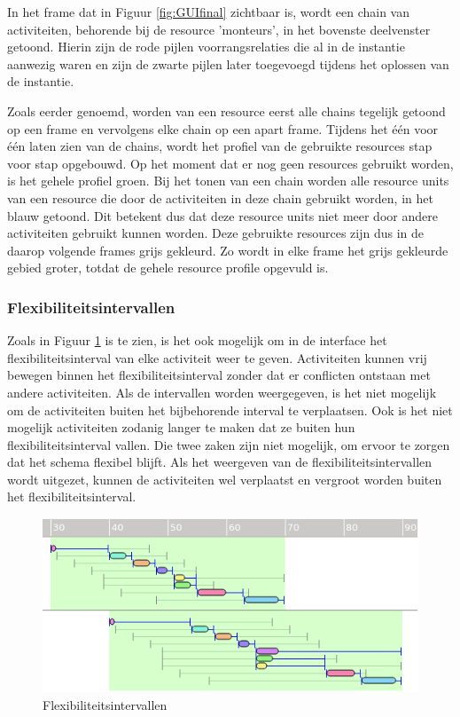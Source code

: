 In het frame dat in Figuur \ref{fig:GUIfinal} zichtbaar is, wordt een chain van activiteiten, behorende bij de resource 'monteurs', in het bovenste deelvenster getoond. Hierin zijn de rode pijlen voorrangsrelaties die al in de instantie aanwezig waren en zijn de zwarte pijlen later toegevoegd tijdens het oplossen van de instantie.

Zoals eerder genoemd, worden van een resource eerst alle chains tegelijk getoond op een frame en vervolgens elke chain op een apart frame. Tijdens het \'e\'en voor \'e\'en laten zien van de chains, wordt  het profiel van de gebruikte resources stap voor stap opgebouwd. Op het moment dat er nog geen resources gebruikt worden, is het gehele profiel groen. Bij het tonen van een chain worden alle resource units van een resource die door de activiteiten in deze chain gebruikt worden, in het blauw getoond. Dit betekent dus dat deze resource units niet meer door andere activiteiten gebruikt kunnen worden. Deze gebruikte resources zijn dus in de daarop volgende frames grijs gekleurd. Zo wordt in elke frame het grijs gekleurde gebied groter, totdat de gehele resource profile opgevuld is.

\subsubsection*{Flexibiliteitsintervallen}
Zoals in Figuur \ref{fig:flex-interval} is te zien, is het ook mogelijk om in de interface het flexibiliteitsinterval van elke activiteit weer te geven. Activiteiten kunnen vrij bewegen binnen het flexibiliteitsinterval zonder dat er conflicten ontstaan met andere activiteiten. Als de intervallen worden weergegeven, is het niet mogelijk om de activiteiten buiten het bijbehorende interval te verplaatsen. Ook is het niet mogelijk activiteiten zodanig langer te maken dat ze buiten hun flexibiliteitsinterval vallen. Die twee zaken zijn niet mogelijk, om ervoor te zorgen dat het schema flexibel blijft. Als het weergeven van de flexibiliteitsintervallen wordt uitgezet, kunnen de activiteiten wel verplaatst en vergroot worden buiten het flexibiliteitsinterval.

\begin{figure}[H]
\center
\includegraphics[width=.7\textwidth]{../images/flex-interval.png}
\caption{Flexibiliteitsintervallen}
\label{fig:flex-interval}
\end{figure}

